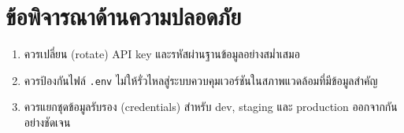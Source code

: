 \section{ข้อพิจารณาด้านความปลอดภัย}
\begin{enumerate}
    \item ควรเปลี่ยน (rotate) API key และรหัสผ่านฐานข้อมูลอย่างสม่ำเสมอ
    \item ควรป้องกันไฟล์ \texttt{.env} ไม่ให้รั่วไหลสู่ระบบควบคุมเวอร์ชันในสภาพแวดล้อมที่มีข้อมูลสำคัญ
    \item ควรแยกชุดข้อมูลรับรอง (credentials) สำหรับ dev, staging และ production ออกจากกันอย่างชัดเจน
\end{enumerate}